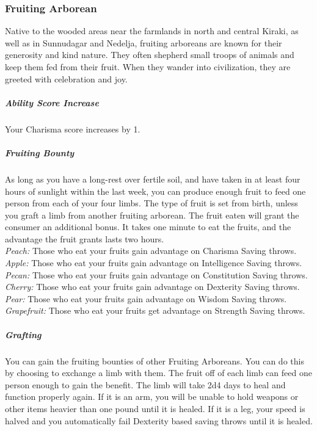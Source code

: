 \subsubsection{Fruiting Arborean}
Native to the wooded areas near the farmlands in north and central Kiraki, as well as in Sunnudagar and Nedelja, fruiting arboreans are known for their generosity and kind nature. They often shepherd small troops of animals and keep them fed from their fruit. When they wander into civilization, they are greeted with celebration and joy.
\subparagraph{Ability Score Increase}Your Charisma score increases by 1.
\subparagraph{Fruiting Bounty}As long as you have a long-rest over fertile soil, and have taken in at least four hours of sunlight within the last week, you can produce enough fruit to feed one person from each of your four limbs. The type of fruit is set from birth, unless you graft a limb from another fruiting arborean. The fruit eaten will grant the consumer an additional bonus. It takes one minute to eat the fruits, and the advantage the fruit grants lasts two hours.\\
\textit{Peach: }Those who eat your fruits gain advantage on Charisma Saving throws.\\
\textit{Apple: }Those who eat your fruits gain advantage on Intelligence Saving throws.\\
\textit{Pecan: }Those who eat your fruits gain advantage on Constitution Saving throws.\\
\textit{Cherry: }Those who eat your fruits gain advantage on Dexterity Saving throws.\\
\textit{Pear: }Those who eat your fruits gain advantage on Wisdom Saving throws.\\
\textit{Grapefruit: }Those who eat your fruits get advantage on Strength Saving throws.\\
\subparagraph{Grafting}You can gain the fruiting bounties of other Fruiting Arboreans. You can do this by choosing to exchange a limb with them. The fruit off of each limb can feed one person enough to gain the benefit. The limb will take 2d4 days to heal and function properly again. If it is an arm, you will be unable to hold weapons or other items heavier than one pound until it is healed. If it is a leg, your speed is halved and you automatically fail Dexterity based saving throws until it is healed.
